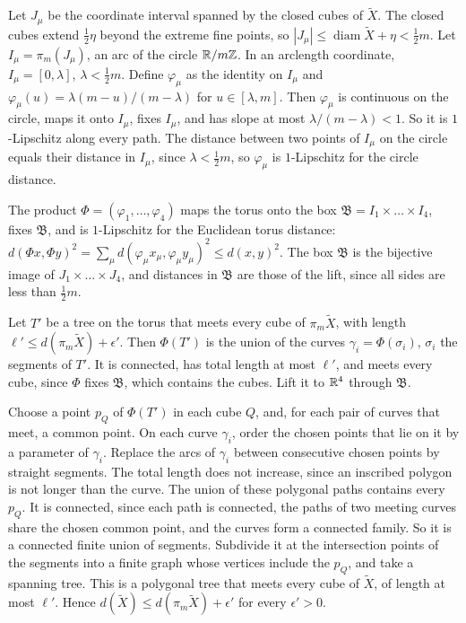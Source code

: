 \begin{step}
Let $J_\mu$ be the coordinate interval spanned by the closed cubes of $\tilde X$. The closed cubes extend $\frac12\eta$ beyond the extreme fine points, so $|J_\mu|\le\operatorname{diam}\tilde X+\eta<\frac12m$. Let $I_\mu=\pi_m(J_\mu)$, an arc of the circle $\mathbb R/m\mathbb Z$. In an arclength coordinate, $I_\mu=[0,\lambda]$, $\lambda<\frac12m$. Define $\varphi_\mu$ as the identity on $I_\mu$ and $\varphi_\mu(u)=\lambda(m-u)/(m-\lambda)$ for $u\in[\lambda,m]$. Then $\varphi_\mu$ is continuous on the circle, maps it onto $I_\mu$, fixes $I_\mu$, and has slope at most $\lambda/(m-\lambda)<1$. So it is $1$-Lipschitz along every path. The distance between two points of $I_\mu$ on the circle equals their distance in $I_\mu$, since $\lambda<\frac12m$, so $\varphi_\mu$ is $1$-Lipschitz for the circle distance.

The product $\Phi=(\varphi_1,\dots,\varphi_4)$ maps the torus onto the box $\mathfrak B=I_1\times\dots\times I_4$, fixes $\mathfrak B$, and is $1$-Lipschitz for the Euclidean torus distance: $d(\Phi x,\Phi y)^2=\sum_\mu d(\varphi_\mu x_\mu,\varphi_\mu y_\mu)^2\le d(x,y)^2$. The box $\mathfrak B$ is the bijective image of $J_1\times\dots\times J_4$, and distances in $\mathfrak B$ are those of the lift, since all sides are less than $\frac12m$.
\end{step}

\begin{step}
Let $T'$ be a tree on the torus that meets every cube of $\pi_m\tilde X$, with length $\ell'\le d(\pi_m\tilde X)+\epsilon'$. Then $\Phi(T')$ is the union of the curves $\gamma_i=\Phi(\sigma_i)$, $\sigma_i$ the segments of $T'$. It is connected, has total length at most $\ell'$, and meets every cube, since $\Phi$ fixes $\mathfrak B$, which contains the cubes. Lift it to $\mathbb R^4$ through $\mathfrak B$.

Choose a point $p_Q$ of $\Phi(T')$ in each cube $Q$, and, for each pair of curves that meet, a common point. On each curve $\gamma_i$, order the chosen points that lie on it by a parameter of $\gamma_i$. Replace the arcs of $\gamma_i$ between consecutive chosen points by straight segments. The total length does not increase, since an inscribed polygon is not longer than the curve. The union of these polygonal paths contains every $p_Q$. It is connected, since each path is connected, the paths of two meeting curves share the chosen common point, and the curves form a connected family. So it is a connected finite union of segments. Subdivide it at the intersection points of the segments into a finite graph whose vertices include the $p_Q$, and take a spanning tree. This is a polygonal tree that meets every cube of $\tilde X$, of length at most $\ell'$. Hence $d(\tilde X)\le d(\pi_m\tilde X)+\epsilon'$ for every $\epsilon'>0$.
\end{step}

